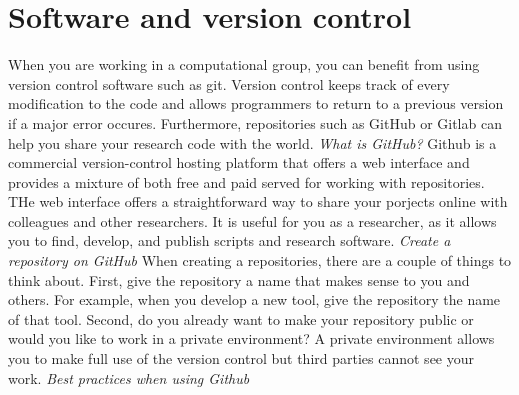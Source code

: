 \section{Software and version control}
When you are working in a computational group, you can benefit from using version control software such as git. Version control keeps track of every modification to the code and allows programmers to return to a previous version if a major error occures. Furthermore, repositories such as GitHub or Gitlab can help you share your research code with the world. 
\whiteline
\textit{What is GitHub?}
Github is a commercial version-control hosting platform that offers a web interface and provides a mixture of both free and paid served for working with repositories. THe web interface offers a straightforward way to share your porjects online with colleagues and other researchers. It is useful for you as a researcher, as it allows you to find, develop, and publish scripts and research software. 
\whiteline
\whiteline
\textit{Create a repository on GitHub}
When creating a repositories, there are a couple of things to think about. First, give the repository a name that makes sense to you and others. For example, when you develop a new tool, give the repository the name of that tool. Second, do you already want to make your repository public or would you like to work in a private environment? A private environment allows you to make full use of the version control but third parties cannot see your work.
\whiteline
\textit{Best practices when using Github}
\whiteline
